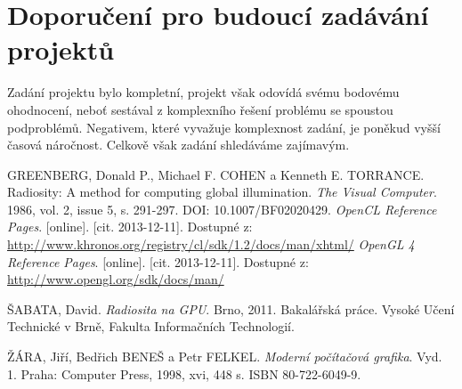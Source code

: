 \documentclass[11pt,a4paper]{article}
\begin{document}
\section{Doporučení pro budoucí zadávání projektů}
Zadání projektu bylo kompletní, projekt však odovídá svému bodovému ohodnocení, neboť sestával z komplexního řešení problému se spoustou podproblémů. Negativem, které vyvažuje komplexnost zadání, je poněkud vyšší časová náročnost. Celkově však zadání shledáváme zajímavým.


\def\refname{\section{Použité zdroje}}
\begin{thebibliography}{9}
   GREENBERG, Donald P., Michael F. COHEN a Kenneth E. TORRANCE. Radiosity: A method for computing global illumination. \emph{The Visual Computer}. 1986, vol. 2, issue 5, s. 291-297. DOI: 10.1007/BF02020429.
  \emph{OpenCL Reference Pages}. [online]. [cit. 2013-12-11]. Dostupné z:\\
    \url{http://www.khronos.org/registry/cl/sdk/1.2/docs/man/xhtml/}
  \emph{OpenGL 4 Reference Pages}. [online]. [cit. 2013-12-11]. Dostupné z:\\
    \url{http://www.opengl.org/sdk/docs/man/}
  
   ŠABATA, David. \emph{Radiosita na GPU}. Brno, 2011. Bakalářská práce. Vysoké Učení Technické v Brně, Fakulta Informačních Technologií. 
  
   ŽÁRA, Jiří, Bedřich BENEŠ a Petr FELKEL. \emph{Moderní počítačová grafika}. Vyd. 1. Praha: Computer Press, 1998, xvi, 448 s. ISBN 80-722-6049-9.
  
\end{thebibliography}
\end{document}
